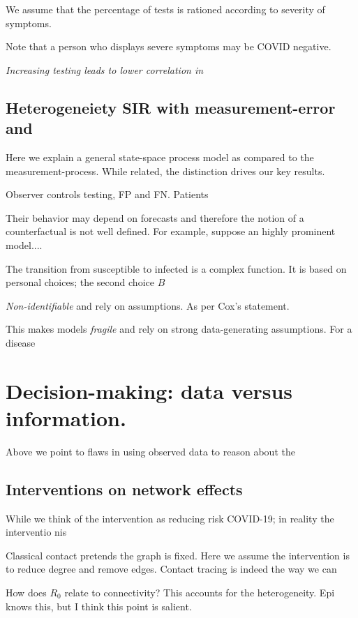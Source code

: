 \documentclass[12pt]{article}
\numberwithin{equation}{section}
\theoremstyle{plain}
\begin{document}
We assume that the percentage of tests is rationed according to severity of symptoms.

Note that a person who displays severe symptoms may be COVID negative.



\emph{Increasing testing leads to lower correlation in}


\subsection{Heterogeneiety  SIR with measurement-error and }

Here we explain a general state-space process model as compared to the measurement-process.  While related, the distinction drives our key results.

Observer controls testing, FP and FN.  Patients

Their behavior may depend on forecasts and therefore the notion of a counterfactual is not well defined.  For example, suppose an highly prominent model....

The transition from susceptible to infected is a complex function.  It is based on personal choices;  the second choice
$B$

\emph{Non-identifiable} and rely on assumptions.  As per Cox's statement.

This makes models \emph{fragile} and rely on strong data-generating assumptions.  For a disease

\section{Decision-making: data versus information.}

Above we point to flaws in using observed data to reason about the

\subsection{Interventions on network effects}

While we think of the intervention as reducing risk COVID-19; in reality the interventio nis

Classical contact pretends the graph is fixed.  Here we assume the intervention is to reduce degree and remove edges.  Contact tracing is indeed the way we can

How does $R_0$ relate to connectivity?  This accounts for the heterogeneity. Epi knows this, but I think this point is salient.
\end{document}

